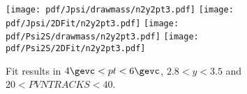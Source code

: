 \begin{figure}[H]
\begin{center}
\texttt{[image: pdf/Jpsi/drawmass/n2y2pt3.pdf]}
\texttt{[image: pdf/Jpsi/2DFit/n2y2pt3.pdf]}
\vspace*{-0.5cm}
\texttt{[image: pdf/Psi2S/drawmass/n2y2pt3.pdf]}
\texttt{[image: pdf/Psi2S/2DFit/n2y2pt3.pdf]}
\vspace*{-0.5cm}
\end{center}
\caption{Fit results in $4\gevc<pt<6\gevc$, $2.8<y<3.5$ and $20<PVNTRACKS<40$.}
\label{Fitn2y2pt3}
\end{figure}
